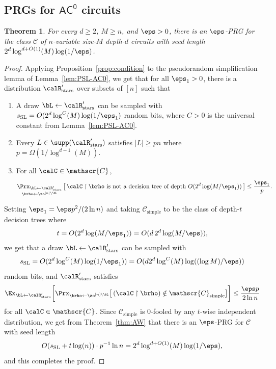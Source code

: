 \documentclass[11pt]{article}
\numberwithin{equation}{section}
\newtheorem{theorem}{Theorem}[section]
\theoremstyle{definition}
\theoremstyle{plain}
\theoremstyle{plain}
\newcommand{\acz}{\mathsf{AC^0}}
\newcommand{\uhr}{\upharpoonright}
\newcommand{\simple}{\mathrm{simple}}
\newcommand{\stars}{\mathrm{stars}}
\newcommand{\SL}{\mathrm{SL}}
\begin{document}
\subsection{PRGs for $\acz$ circuits} 


\begin{theorem}
For every $d\ge 2$, $M \geq n$, and $\eps > 0$, there is an $\eps$-PRG for the class $\mathscr{C}$ of $n$-variable size-$M$ depth-$d$ circuits with seed length $2^d\log^{d+O(1)}(M)\log(1/\eps)$. 
\end{theorem}


\begin{proof} 
Applying Proposition~\ref{prop:condition} to the pseudorandom simplification lemma of Lemma~\ref{lem:PSL-AC0}, we get that for all $\eps_1 > 0$, there is a distribution $\calR'_\stars$ over subsets of $[n]$ such that 
\begin{enumerate} 

\item A draw $\bL\leftarrow\calR'_\stars$ can be sampled with $s_\SL = O( 2^{d} \log^{C}(M) \log(1/\eps_1)$ random bits, where $C > 0$ is the universal constant from Lemma~\ref{lem:PSL-AC0}.
%
%

\item Every $L \in \supp(\calR'_\stars)$ satisfies $|L| \ge pn$ where $p = \Omega(1/\log^{d-1}(M))$. 
\item For all $\calC \in \mathscr{C}$,  
\[ \mathop{\Prx_{\bL\leftarrow\calR'_\stars}}_{\brho\leftarrow\zo^{[n]\setminus \bL}}\big[\,\text{$\calC \uhr \brho$ is not a decision tree of depth $O(2^d\log(M/\eps_1))$}\,\big] \le \frac{\eps_1}{p}. \]
\end{enumerate}
Setting $\eps_1 = \eps p^2/(2\ln n)$ and taking $\mathscr{C}_\simple$ to be the class of depth-$t$ decision trees where 
\[ t = O(2^d \log(M/\eps_1)) = O(d \,2^d\log(M/\eps)), \]
we get that a draw $\bL \leftarrow\calR'_\stars$ can be sampled with  
\[ s_\SL = O(2^d \log^C(M) \log(1/\eps_1) )=  O(d 2^d \log^C(M) \log((\log M)/\eps)) \]
random bits, and $\calR'_\stars$ satisfies
 \[ \Ex_{\bL\leftarrow\calR'_{\stars}}\bigg[ \Prx_{\brho\leftarrow\zo^{[n]\setminus \bL}}\big[\, (\calC \uhr \brho) \notin \mathscr{C}_\simple\big] \bigg]  \le \frac{\eps p}{2\ln n} \] 
for all $\calC \in \mathscr{C}$. Since $\mathscr{C}_\simple$ is $0$-fooled by any $t$-wise independent distribution, we get from Theorem~\ref{thm:AW} that there is an $\eps$-PRG for $\mathscr{C}$ with seed length 
 \[ O(s_\SL + t \log(n)) \cdot p^{-1}\ln n  = 2^d\log^{d+O(1)}(M)\log(1/\eps),\]
 and this completes the proof.
%
\end{proof} 
\end{document}
